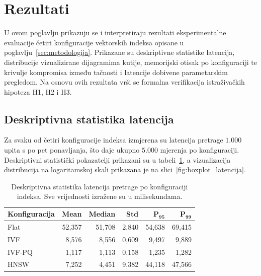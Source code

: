 \section{Rezultati}
\label{sec:rezultati}

U ovom poglavlju prikazuju se i interpretiraju rezultati
eksperimentalne evaluacije četiri konfiguracije vektorskih
indeksa opisane u poglavlju~\ref{sec:metodologija}.
Prikazane su deskriptivne statistike latencija, distribucije
vizualizirane dijagramima kutije, memorijski otisak po
konfiguraciji te krivulje kompromisa između tačnosti i
latencije dobivene parametarskim pregledom.
Na osnovu ovih rezultata vrši se formalna verifikacija
istraživačkih hipoteza H1, H2 i H3.

\subsection{Deskriptivna statistika latencija}
\label{sec:stat_latencija}

Za svaku od četiri konfiguracije indeksa izmjerena su
latencija pretrage $1{.}000$ upita s po pet ponavljanja,
što daje ukupno $5{.}000$ mjerenja po konfiguraciji.
Deskriptivni statistički pokazatelji prikazani su u
tabeli~\ref{tab:latencija_stat}, a vizualizacija
distribucija na logaritamskoj skali prikazana je na
slici~\ref{fig:boxplot_latencija}.

\begin{table}[htbp]
	\centering
	\caption{Deskriptivna statistika latencija pretrage po
		konfiguraciji indeksa. Sve vrijednosti
		izražene su u milisekundama.}
	\label{tab:latencija_stat}
	\begin{tabular}{lrrrrr}
		\hline
		\textbf{Konfiguracija} &
		\textbf{Mean}          &
		\textbf{Median}        &
		\textbf{Std}           &
		$\mathbf{P_{95}}$      &
		$\mathbf{P_{99}}$                                                            \\
		\hline
		Flat                   & 52{,}357 & 51{,}708 & 2{,}840 & 54{,}638 & 69{,}415 \\
		IVF                    & 8{,}576  & 8{,}556  & 0{,}609 & 9{,}497  & 9{,}889  \\
		IVF-PQ                 & 1{,}117  & 1{,}113  & 0{,}158 & 1{,}235  & 1{,}282  \\
		HNSW                   & 7{,}252  & 4{,}451  & 9{,}382 & 44{,}118 & 47{,}566 \\
		\hline
	\end{tabular}
	\vspace{4pt}
\end{table}

